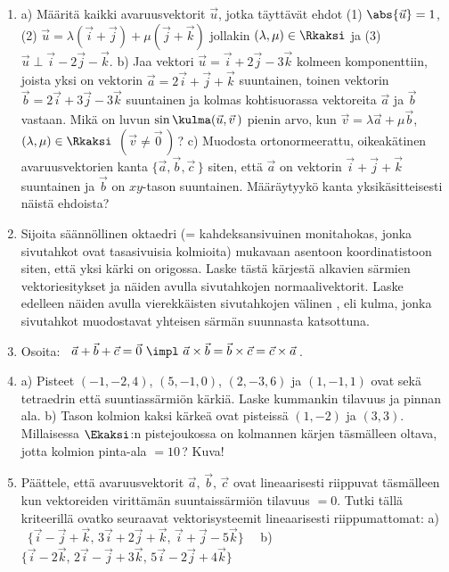 \begin{enumerate}
\item
a) Määritä kaikki avaruusvektorit $\vec u$, jotka täyttävät ehdot (1) $\abs{\vec u}=1$, \newline
(2) $\vec u=\lambda(\vec i+\vec j)+\mu(\vec j+\vec k)$ jollakin $(\lambda,\mu)\in\Rkaksi$
ja (3) $\vec u \perp \vec i-2\vec j-\vec k$. \vspace{1mm}\newline
b) Jaa vektori $\vec u=\vec i+2\vec j-3\vec k$ kolmeen komponenttiin, joista yksi on vektorin
$\vec a=2\vec i+\vec j+\vec k$ suuntainen, toinen vektorin $\vec b=2\vec i+3\vec j-3\vec k$
suuntainen ja kolmas kohtisuorassa vektoreita $\vec a$ ja $\vec b$ vastaan. Mikä on luvun
$\sin\kulma(\vec u,\vec v\,)$ pienin arvo, kun $\vec v=\lambda\vec a + \mu\vec b$, 
$(\lambda,\mu)\in\Rkaksi$ $(\vec v\neq\vec 0\,)$\,? \vspace{1mm}\newline
c) Muodosta ortonormeerattu, oikeakätinen avaruusvektorien kanta $\{\vec a,\vec b,\vec c\,\}$ 
siten, että $\vec a$ on vektorin $\vec i+\vec j+\vec k$ suuntainen ja $\vec b$ on $xy$-tason 
suuntainen. Määräytyykö kanta yksikäsitteisesti näistä ehdoista?

\item \label{H-I-7:oktaedri}
Sijoita säännöllinen oktaedri (= kahdeksansivuinen monitahokas, jonka sivutahkot ovat 
tasasivuisia kolmioita) mukavaan asentoon koordinatistoon siten, että yksi kärki on origossa.
Laske tästä kärjestä alkavien särmien vektoriesitykset ja näiden avulla sivutahkojen 
normaalivektorit. Laske edelleen näiden avulla vierekkäisten sivutahkojen välinen 
%
, eli kulma, jonka sivutahkot muodostavat yhteisen särmän suunnasta
katsottuna.

\item
Osoita: \ $\vec a+\vec b+\vec c=\vec 0\ \impl\ 
                       \vec a\times\vec b=\vec b\times\vec c=\vec c\times\vec a\,$.

\item
a) Pisteet $(-1,-2,4)$, $(5,-1,0)$, $(2,-3,6)$ ja $(1,-1,1)$ ovat sekä tetraedrin että
suuntiassärmiön kärkiä. Laske kummankin tilavuus ja pinnan ala. \vspace{1mm}\newline
 b) Tason kolmion kaksi kärkeä ovat pisteissä $(1,-2)$ ja $(3,3)$. Millaisessa $\Ekaksi$:n
pistejoukossa on kolmannen kärjen täsmälleen oltava, jotta kolmion pinta-ala $=10$\,? Kuva!

\item
Päättele, että avaruusvektorit $\vec a,\,\vec b,\,\vec c$ ovat lineaarisesti riippuvat
täsmälleen kun vektoreiden virittämän suuntaissärmiön tilavuus $=0$. Tutki tällä kriteerillä
ovatko seuraavat vektorisysteemit lineaarisesti riippumattomat: \vspace{1mm}\newline
a) \ $\{\vec i-\vec j+\vec k,\,3\vec i+2\vec j+\vec k,\,\vec i+\vec j-5\vec k\} \quad$
b) \ $\{\vec i-2\vec k,\,2\vec i-\vec j+3\vec k,\,5\vec i-2\vec j+4\vec k\}$


\end{enumerate}
